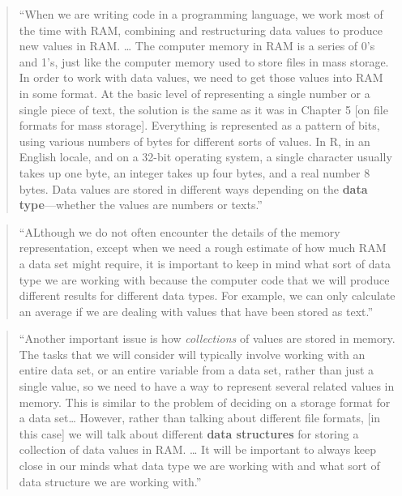 \documentclass[]{tufte-book}
\begin{document}
\begin{quote}
``When we are writing code in a programming language, we work most of the time with RAM,
combining and restructuring data values to produce new values in RAM. \ldots{} The computer memory
in RAM is a series of 0's and 1's, just like the computer memory used to store files in mass
storage. In order to work with data values, we need to get those values into RAM in some
format. At the basic level of representing a single number or a single piece of text, the
solution is the same as it was in Chapter 5 {[}on file formats for mass storage{]}. Everything
is represented as a pattern of bits, using various numbers of bytes for different sorts of
values. In R, in an English locale, and on a 32-bit operating system, a single character
usually takes up one byte, an integer takes up four bytes, and a real number 8 bytes.
Data values are stored in different ways depending on the \textbf{data type}---whether the values
are numbers or texts.'' \citep{murrell2009introduction}
\end{quote}

\begin{quote}
``ALthough we do not often encounter the details of the memory representation, except
when we need a rough estimate of how much RAM a data set might require, it is
important to keep in mind what sort of data type we are working with because the computer
code that we will produce different results for different data types. For example,
we can only calculate an average if we are dealing with values that have been stored
as text.'' \citep{murrell2009introduction}
\end{quote}

\begin{quote}
``Another important issue is how \emph{collections} of values are stored in memory. The
tasks that we will consider will typically involve working with an entire data set,
or an entire variable from a data set, rather than just a single value, so we need
to have a way to represent several related values in memory. This is similar to the
problem of deciding on a storage format for a data set\ldots{} However, rather than talking
about different file formats, {[}in this case{]} we will talk about different \textbf{data
structures} for storing a collection of data values in RAM. \ldots{} It will be important
to always keep close in our minds what data type we are working with and what sort
of data structure we are working with.'' \citep{murrell2009introduction}
\end{quote}
\end{document}
